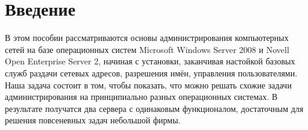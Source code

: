 \documentclass[a4paper,12pt]{article}
\begin{document}

\tableofcontents
\newpage

\section*{Введение}
В этом пособии рассматриваются основы администрирования компьютерных сетей на базе операционных систем Microsoft Windows Server 2008 и Novell Open Enterprise Server 2, начиная с установки, заканчивая настойкой базовых служб раздачи сетевых адресов, разрешения имён, управления пользователями. Наша задача состоит в том, чтобы показать, что можно решать схожие задачи администрирования на принципиально разных операционных системах. В результате получатся два сервера с одинаковым функционалом, достаточным для решения повсеневных задач небольшой фирмы.


\newpage
\setcounter{section}{0}

\newpage
\end{document}
